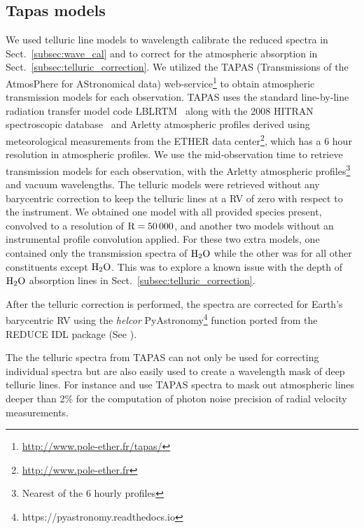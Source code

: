 \subsection{Tapas models}
\label{subsec:tapas_models}
We used telluric line models to wavelength calibrate the reduced spectra in Sect.~\ref{subsec:wave_cal} and to correct for the atmospheric absorption in Sect.~\ref{subsec:telluric_correction}. We utilized the TAPAS (Transmissions of the AtmosPhere for AStronomical data) web-service\footnote{\url{http://www.pole-ether.fr/tapas/}} \citep{bertaux_tapas_2014} to obtain atmospheric transmission models for each observation. TAPAS uses the standard line-by-line radiation transfer model code LBLRTM~\citep{clough_linebyline_1995} along with the 2008 HITRAN spectroscopic database~\citep{rothman_hitran_2009} and Arletty atmospheric profiles derived using meteorological measurements from the ETHER data center\footnote{\url{http://www.pole-ether.fr}}, which has a 6 hour resolution in atmospheric profiles.
We use the mid-observation time to retrieve transmission models for each observation, with the Arletty atmospheric profiles\footnote{Nearest of the 6 hourly profiles} and vacuum wavelengths. The telluric models were retrieved without any barycentric correction to keep the telluric lines at a RV of zero with respect to the instrument. We obtained one model with all provided species present, convolved to a resolution of \(\rm R=50\,000 \), and another two models without an instrumental profile convolution applied. For these two extra models, one contained only the transmission spectra of \(\rm H_{2}O \) while the other was for all other constituents except \(\rm H_{2}O \). This was to explore a known issue \citep{bertaux_tapas_2014} with the depth of \(\rm H_{2}O \) absorption lines in Sect.~\ref{subsec:telluric_correction}.

After the telluric correction is performed, the spectra are corrected for Earth's barycentric RV using the \emph{helcor} PyAstronomy\footnote{https://pyastronomy.readthedocs.io} function ported from the REDUCE IDL package (See \citet[][]{piskunov_new_2002}).



The the telluric spectra from TAPAS can not only be used for correcting individual spectra but are also easily used to create a wavelength mask of deep telluric lines. For instance \citet{figueira_radial_2016} and \citet{artigau_optical_2018} use TAPAS spectra to mask out atmospheric lines deeper than 2\% for the computation of photon noise precision of radial velocity measurements. 




